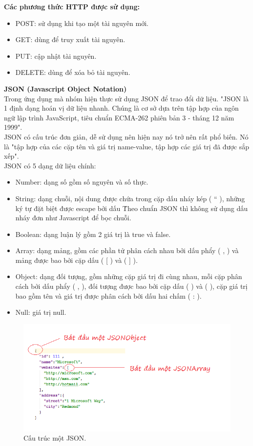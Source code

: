 \documentclass[a4paper,12pt,oneside]{article}
\begin{document}
\textbf{Các phương thức HTTP được sử dụng:}
\begin{itemize}
\item POST: sử dụng khi tạo một tài nguyên mới.
\item GET: dùng để truy xuất tài nguyên.
\item PUT: cập nhật tài nguyên.
\item DELETE: dùng để xóa bỏ tài nguyên.
\end{itemize}
\textbf{JSON (Javascript Object Notation)}\\
 Trong ứng dụng mà nhóm hiện thực sử dụng JSON để trao đổi dữ liệu. "JSON là 1 định dạng hoán vị dữ liệu nhanh. Chúng là cơ sở dựa trên tập hợp của ngôn ngữ lập trình JavaScript, tiêu chuẩn ECMA-262 phiên bản 3 - tháng 12 năm 1999"\cite{json}.\\
 JSON có cấu trúc đơn giản, dễ sử dụng nên hiện nay nó trở nên rất phổ biến. Nó là "tập hợp của các cặp tên và giá trị name-value, tập hợp các giá trị đã được sắp xếp"\cite{json}.\\
 JSON có 5 dạng dữ liệu chính:
\begin{itemize}
	\item Number: dạng số gồm số nguyên và số thực.
	\item String: dạng chuỗi, nội dung được chứa trong cặp dấu nháy kép ( “ ), những ký tự đặt biệt được escape bởi dấu \.Theo chuẩn JSON thì không sử dụng dấu nháy đơn như Javascript để bọc chuỗi.
	\item Boolean: dạng luận lý gồm 2 giá trị là true và false.
	\item Array: dạng mảng, gồm các phần tử phân cách nhau bởi dấu phẩy ( , ) và mảng được bao bởi cặp dấu ( [ ) và ( ] ).
	\item Object: dạng đối tượng, gồm những cặp giá trị đi cùng nhau, mỗi cặp phân cách bởi dấu phẩy ( , ), đối tượng được bao bởi cặp dấu ( { ) và ( } ), cặp giá trị bao gồm tên và giá trị được phân cách bởi dấu hai chấm ( : ).
	\item Null: giá trị null.
\end{itemize}

\begin{figure}[H]
	\centering
	\includegraphics[scale=.8]{hinh/json.png}
	\caption{Cấu trúc một JSON\cite{json}.}
	\label{fig:json}
\end{figure}
\end{document}
